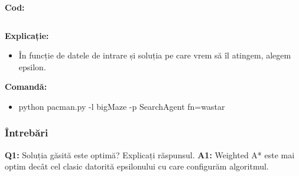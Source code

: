 \textbf{Cod:}
\inputminted[linenos]{python}{code/06_wastar.py}


\textbf{Explicație:}
\begin{itemize}
    \setlength\itemsep{0em}
    \item În funcție de datele de intrare și soluția pe care vrem să îl atingem, alegem epsilon. 

\end{itemize}


\textbf{Comandă:}
\begin{itemize}
    \setlength\itemsep{0em}
    \item python pacman.py -l bigMaze -p SearchAgent fn=wastar
        
\end{itemize}

\subsubsection{Întrebări}

\textbf{Q1:} Soluția găsită este optimă? Explicați răspunsul.
\newline
\textbf{A1:} Weighted A* este mai optim decât cel clasic datorită epsilonului cu care configurăm algoritmul.
\vspace{0.75cm}
\pagebreak
